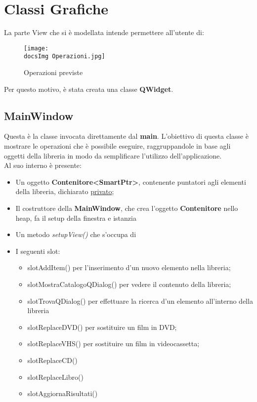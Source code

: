\section{Classi Grafiche}{
	La parte View che si è modellata intende permettere all'utente di:

	\begin{figure}[h]
			\begin{center}
				\texttt{[image: \\docsImg Operazioni.jpg]}
				\caption{Operazioni previste}
			\end{center}
	\end{figure}
	
	Per questo motivo, è stata creata una classe \textbf{QWidget}.
	\subsection{MainWindow}{
		Questa è la classe invocata direttamente dal \textbf{main}. L'obiettivo di questa classe è mostrare le operazioni che è possibile eseguire, raggruppandole in base agli oggetti della libreria in modo da semplificare l'utilizzo dell'applicazione.\\
		Al suo interno è presente:
		\begin{itemize}\itemsep=0.5pt
			\item Un oggetto \textbf{Contenitore<SmartPtr>}, contenente puntatori agli elementi della libreria, dichiarato \underline{privato};
			\item Il costruttore della \textbf{MainWindow}, che crea l'oggetto \textbf{Contenitore} nello heap, fa il setup della finestra e istanzia 
			\item Un metodo \textit{setupView()} che s'occupa di
			\item I seguenti slot:
			\begin{itemize}\itemsep=0.5pt
				\item slotAddItem() per l'inserimento d'un nuovo elemento nella libreria;
				\item slotMostraCatalogoQDialog()  per vedere il contenuto della libreria;
				\item slotTrovaQDialog() per effettuare la ricerca d'un elemento all'interno della libreria
			    \item slotReplaceDVD() per sostituire un film in DVD;
			    \item slotReplaceVHS() per sostituire un film in videocassetta;
			    \item slotReplaceCD()
			    \item slotReplaceLibro()
			    \item slotAggiornaRisultati() 
			\end{itemize}
		\end{itemize}
	}
	
}
